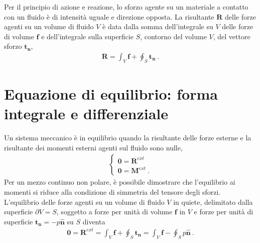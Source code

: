 \documentclass[letterpaper,10pt,italian]{jupyterBook}
\begin{document}
\sphinxAtStartPar
Per il principio di azione e reazione, lo sforzo agente su un materiale
a contatto con un fluido è di intensità uguale e direzione opposta. La
risultante \(\mathbf{R}\) delle forze agenti su un volume di fluido \(V\) è data
dalla somma dell’integrale su \(V\) delle forze di volume \(\mathbf{f}\) e
dell’integrale sulla superficie \(S\), contorno del volume \(V\), del
vettore sforzo \(\mathbf{t_n}\),
\begin{equation*}
\begin{split}\mathbf{R} = \int_V \mathbf{f} + \oint_S \mathbf{t_n} \ .\end{split}
\end{equation*}

\section{Equazione di equilibrio: forma integrale e differenziale}
\label{\detokenize{polimi/fluidmechanics-ita/template/capitoli/01_statica/02teoria:equazione-di-equilibrio-forma-integrale-e-differenziale}}\label{\detokenize{polimi/fluidmechanics-ita/template/capitoli/01_statica/02teoria:fluid-mechanics-statics-equil}}
\sphinxAtStartPar
Un sistema meccanico è in equilibrio quando la risultante delle forze
esterne e la risultante dei momenti esterni agenti sul fluido sono
nulle,
\begin{equation*}
\begin{split}\begin{cases}
 \mathbf{0} = \mathbf{R}^{ext} \\
 \mathbf{0} = \mathbf{M}^{ext}  \ .
\end{cases}\end{split}
\end{equation*}
\sphinxAtStartPar
Per un mezzo continuo non polare, è possibile dimostrare
che l’equilibrio ai momenti si riduce alla condizione di simmetria del
tensore degli sforzi. L’equilibrio delle forze agenti su un volume di
fluido \(V\) in quiete, delimitato dalla superficie \(\partial V = S\),
soggetto a forze per unità di volume \(\mathbf{f}\) in \(V\) e forze per unità
di superficie \(\mathbf{t_n}=-p \mathbf{\hat{n}}\) su \(S\) diventa
\begin{equation*}
\begin{split}\mathbf{0} = \mathbf{R}^{ext} = \int_V \mathbf{f} + \oint_S \mathbf{t_n} = \int_V \mathbf{f} - \oint_S p \mathbf{\hat{n}} \ .\end{split}
\end{equation*}
\sphinxAtStartPar
\end{document}
